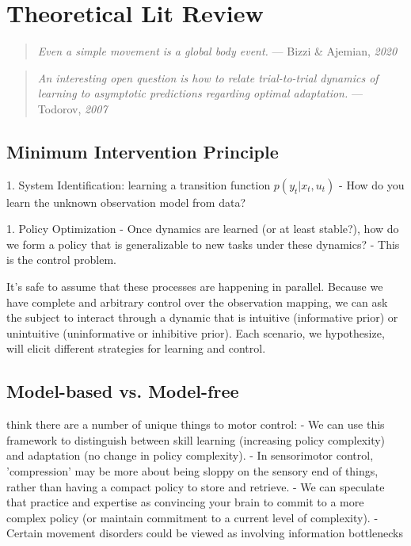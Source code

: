 \documentclass[../main.tex]{subfiles}
\begin{document}
\chapter{Theoretical Lit Review}\label{chap:bg_theory}


\begin{quote}
  \emph{Even a simple movement is a global body event.}
  --- Bizzi \& Ajemian, \emph{2020}
\end{quote}  

\begin{quote}
  \emph{An interesting open question is how to relate trial-to-trial
  dynamics of learning to asymptotic predictions regarding optimal
  adaptation.}
  --- Todorov, \emph{2007}
\end{quote}


\section{Minimum Intervention Principle}

1. System Identification: learning a transition function $p(y_t|x_t, u_t)$
- How do you learn the unknown observation model from data?

1. Policy Optimization
- Once dynamics are learned (or at least stable?), how do we form a policy that is generalizable to new tasks under these dynamics?
- This is the control problem.

It's safe to assume that these processes are happening in parallel. Because we have complete and arbitrary control over the observation mapping, we can ask the subject to interact through a  dynamic that is intuitive (informative prior) or unintuitive (uninformative or inhibitive prior). Each scenario, we hypothesize, will elicit different strategies for learning and control.


\section{Model-based vs. Model-free}

think there are a number of unique things to motor control:
- We can use this framework to distinguish between skill learning (increasing policy complexity) and adaptation (no change in policy complexity).
- In sensorimotor control, 'compression' may be more about being sloppy on the sensory end of things, rather than having a compact policy to store and retrieve.
- We can speculate that practice and expertise as convincing your brain to commit to a more complex policy (or maintain commitment to a current level of complexity).
- Certain movement disorders could be viewed as involving information bottlenecks
\end{document}
